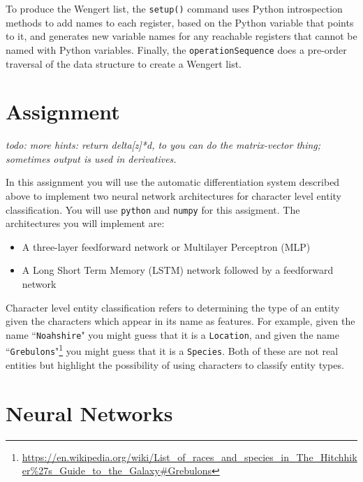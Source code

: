 \documentclass[12pt]{article}
\newcommand{\wc}[1]{\textit{todo: #1}}
\newcommand{\cd}[1]{\texttt{#1}}
\begin{document}
To produce the Wengert list, the \cd{setup()} command uses Python
introspection methods to add names to each register, based on the
Python variable that points to it, and generates new variable names
for any reachable registers that cannot be named with Python
variables.  Finally, the \cd{operationSequence} does a pre-order
traversal of the data structure to create a Wengert list.

\section{Assignment}

\wc{more hints: return delta[z]*d, to you can do the matrix-vector
  thing; sometimes output is used in derivatives.}

In this assignment you will use the automatic differentiation system described above
to implement two neural network architectures for character level entity classification. You 
will use \texttt{python} and \texttt{numpy} for this assigment.
The architectures you will implement are:
\begin{itemize}
    \item A three-layer feedforward network or Multilayer Perceptron (MLP)
    \item A Long Short Term Memory (LSTM) network followed by a feedforward network
\end{itemize}

Character level entity classification refers to determining the type of an entity 
given the characters which appear in its name as features. For example, given the name
``\cd{Noahshire}" you might guess that it is a \cd{Location}, and given the name
``\cd{Grebulons}"\footnote{\url{https://en.wikipedia.org/wiki/List_of_races_and_species_in_The_Hitchhiker\%27s_Guide_to_the_Galaxy#Grebulons}} you might guess that it is a \cd{Species}. 
Both of these are not real entities but highlight the possibility of using characters to classify entity types.

\section{Neural Networks}
\end{document}
